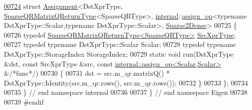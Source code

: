 \begin{DoxyCode}
\hyperlink{struct_eigen_1_1internal_1_1_assignment_3_01_dst_xpr_type_00_01_sparse_q_r_matrix_q_return_type_aa91d8fc26832a494363cd7146c14303}{00724} \textcolor{keyword}{struct }\hyperlink{struct_eigen_1_1internal_1_1_assignment}{Assignment}<DstXprType, \hyperlink{struct_eigen_1_1_sparse_q_r_matrix_q_return_type}{SparseQRMatrixQReturnType}<SparseQRType>, 
      \hyperlink{namespaceinternal}{internal}::\hyperlink{struct_eigen_1_1internal_1_1assign__op}{assign\_op}<typename DstXprType::Scalar,typename DstXprType::Scalar>, 
      \hyperlink{struct_eigen_1_1internal_1_1_sparse2_dense}{Sparse2Dense}>
00725 \{
00726   \textcolor{keyword}{typedef} \hyperlink{struct_eigen_1_1_sparse_q_r_matrix_q_return_type}{SparseQRMatrixQReturnType<SparseQRType>} 
      \hyperlink{struct_eigen_1_1_sparse_q_r_matrix_q_return_type}{SrcXprType};
00727   \textcolor{keyword}{typedef} \textcolor{keyword}{typename} DstXprType::Scalar Scalar;
00728   \textcolor{keyword}{typedef} \textcolor{keyword}{typename} DstXprType::StorageIndex StorageIndex;
00729   \textcolor{keyword}{static} \textcolor{keywordtype}{void} run(DstXprType &dst, \textcolor{keyword}{const} SrcXprType &src, \textcolor{keyword}{const} 
      \hyperlink{struct_eigen_1_1internal_1_1assign__op}{internal::assign\_op<Scalar,Scalar>} &\textcolor{comment}{/*func*/})
00730   \{
00731     dst = src.m\_qr.matrixQ() * DstXprType::Identity(src.m\_qr.rows(), src.m\_qr.rows());
00732   \}
00733 \};
00734 
00735 \} \textcolor{comment}{// end namespace internal}
00736 
00737 \} \textcolor{comment}{// end namespace Eigen}
00738 
00739 \textcolor{preprocessor}{#endif}
\end{DoxyCode}
